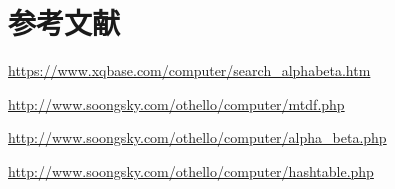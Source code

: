 \documentclass{ctexrep}
\begin{document}
\chapter{参考文献}

\vspace{1.5cm}


\href{https://www.xqbase.com/computer/search_alphabeta.htm
}{https://www.xqbase.com/computer/search_alphabeta.htm
}
\vspace{0.7cm}

\href{http://www.soongsky.com/othello/computer/mtdf.php
}{http://www.soongsky.com/othello/computer/mtdf.php
}
\vspace{0.7cm}

\href{http://www.soongsky.com/othello/computer/alpha_beta.php
}{http://www.soongsky.com/othello/computer/alpha_beta.php
}
\vspace{0.7cm}

\href{http://www.soongsky.com/othello/computer/hashtable.php
}{http://www.soongsky.com/othello/computer/hashtable.php
}




  
\end{document}
